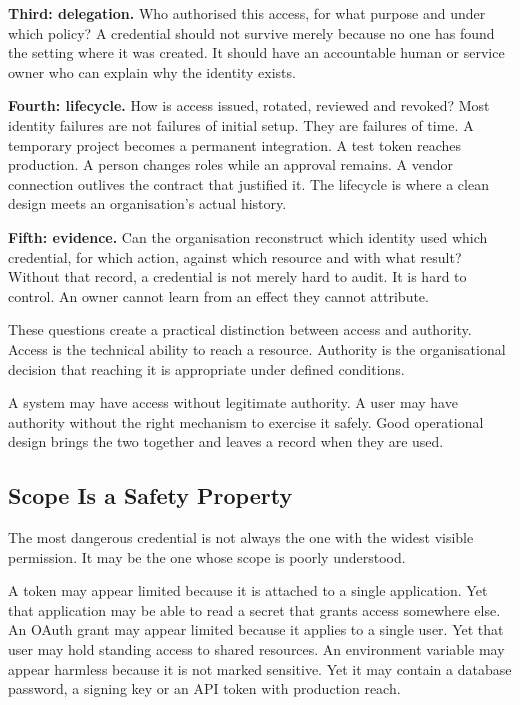 \textbf{Third: delegation.} Who authorised this access, for what purpose
and under which policy? A credential should not survive merely because
no one has found the setting where it was created. It should have an
accountable human or service owner who can explain why the identity
exists.

\textbf{Fourth: lifecycle.} How is access issued, rotated, reviewed and
revoked? Most identity failures are not failures of initial setup. They
are failures of time. A temporary project becomes a permanent
integration. A test token reaches production. A person changes roles
while an approval remains. A vendor connection outlives the contract
that justified it. The lifecycle is where a clean design meets an
organisation's actual history.

\textbf{Fifth: evidence.} Can the organisation reconstruct which
identity used which credential, for which action, against which resource
and with what result? Without that record, a credential is not merely
hard to audit. It is hard to control. An owner cannot learn from an
effect they cannot attribute.

These questions create a practical distinction between access and
authority. Access is the technical ability to reach a resource.
Authority is the organisational decision that reaching it is appropriate
under defined conditions.

A system may have access without legitimate authority. A user may have
authority without the right mechanism to exercise it safely. Good
operational design brings the two together and leaves a record when they
are used.

\subsection{Scope Is a Safety
Property}\label{scope-is-a-safety-property}

The most dangerous credential is not always the one with the widest
visible permission. It may be the one whose scope is poorly understood.

A token may appear limited because it is attached to a single
application. Yet that application may be able to read a secret that
grants access somewhere else. An OAuth grant may appear limited because
it applies to a single user. Yet that user may hold standing access to
shared resources. An environment variable may appear harmless because it
is not marked sensitive. Yet it may contain a database password, a
signing key or an API token with production reach.

